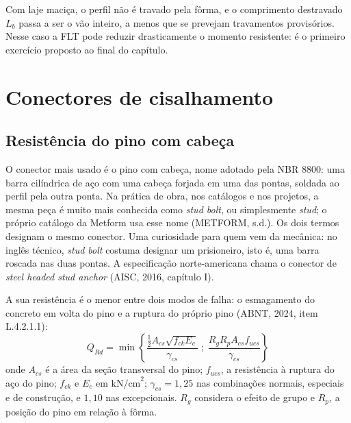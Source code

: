 \documentclass[11pt,a4paper]{article}
\begin{document}
Com laje maciça, o perfil não é travado pela fôrma, e o comprimento destravado $L_b$ passa a ser o vão inteiro, a menos que se prevejam travamentos provisórios. Nesse caso a FLT pode reduzir drasticamente o momento resistente: é o primeiro exercício proposto ao final do capítulo.

\section{Conectores de cisalhamento}

\subsection{Resistência do pino com cabeça}

O conector mais usado é o pino com cabeça, nome adotado pela NBR 8800: uma barra cilíndrica de aço com uma cabeça forjada em uma das pontas, soldada ao perfil pela outra ponta. Na prática de obra, nos catálogos e nos projetos, a mesma peça é muito mais conhecida como \textit{stud bolt}, ou simplesmente \textit{stud}; o próprio catálogo da Metform usa esse nome (METFORM, s.d.). Os dois termos designam o mesmo conector. Uma curiosidade para quem vem da mecânica: no inglês técnico, \textit{stud bolt} costuma designar um prisioneiro, isto é, uma barra roscada nas duas pontas. A especificação norte-americana chama o conector de \textit{steel headed stud anchor} (AISC, 2016, capítulo I).

A sua resistência é o menor entre dois modos de falha: o esmagamento do concreto em volta do pino e a ruptura do próprio pino (ABNT, 2024, item L.4.2.1.1):
\begin{equation}
  Q_{Rd} = \min\left\{\frac{\frac{1}{2} A_{cs}\sqrt{f_{ck} E_c}}{\gamma_{cs}} \; ; \; \frac{R_g R_p A_{cs} f_{ucs}}{\gamma_{cs}}\right\}
  \label{eq:qrd-pino}
\end{equation}
onde $A_{cs}$ é a área da seção transversal do pino; $f_{ucs}$, a resistência à ruptura do aço do pino; $f_{ck}$ e $E_c$ em $\text{kN/cm}^2$; $\gamma_{cs} = 1{,}25$ nas combinações normais, especiais e de construção, e $1{,}10$ nas excepcionais. $R_g$ considera o efeito de grupo e $R_p$, a posição do pino em relação à fôrma.
\end{document}
